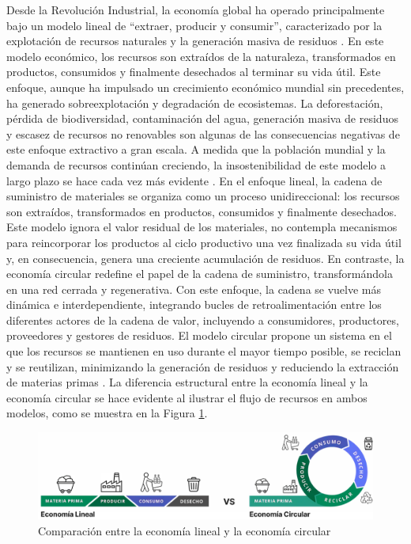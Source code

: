 Desde la Revolución Industrial, la economía global ha operado principalmente bajo un modelo lineal de ``extraer, producir y consumir'', caracterizado por la explotación de recursos naturales y la generación masiva de residuos \cite{cerda2016economia}. En este modelo económico, los recursos son extraídos de la naturaleza, transformados en productos, consumidos y finalmente desechados al terminar su vida útil. Este enfoque, aunque ha impulsado un crecimiento económico mundial sin precedentes, ha generado sobreexplotación y degradación de ecosistemas. La deforestación, pérdida de biodiversidad, contaminación del agua, generación masiva de residuos y escasez de recursos no renovables son algunas de las consecuencias negativas de este enfoque extractivo a gran escala. A medida que la población mundial y la demanda de recursos continúan creciendo, la insostenibilidad de este modelo a largo plazo se hace cada vez más evidente \cite{clima2022book}. En el enfoque lineal, la cadena de suministro de materiales se organiza como un proceso unidireccional: los recursos son extraídos, transformados en productos, consumidos y finalmente desechados. Este modelo ignora el valor residual de los materiales, no contempla mecanismos para reincorporar los productos al ciclo productivo una vez finalizada su vida útil y, en consecuencia, genera una creciente acumulación de residuos. En contraste, la economía circular redefine el papel de la cadena de suministro, transformándola en una red cerrada y regenerativa. Con este enfoque, la cadena se vuelve más dinámica e interdependiente, integrando bucles de retroalimentación entre los diferentes actores de la cadena de valor, incluyendo a consumidores, productores, proveedores y gestores de residuos. El modelo circular propone un sistema en el que los recursos se mantienen en uso durante el mayor tiempo posible, se reciclan y se reutilizan, minimizando la generación de residuos y reduciendo la extracción de materias primas \cite{ellenmacarthurfoundation2022}. La diferencia estructural entre la economía lineal y la economía circular se hace evidente al ilustrar el flujo de recursos en ambos modelos, como se muestra en la Figura \ref{fig:circular-linear-economy-comparison}.

\begin{figure}[!tb]
    \centering
    \includegraphics[width=\textwidth]{Figures/circular-linear-economy-comparison.png}
    \caption{Comparación entre la economía lineal y la economía circular}
    \label{fig:circular-linear-economy-comparison}
\end{figure}

